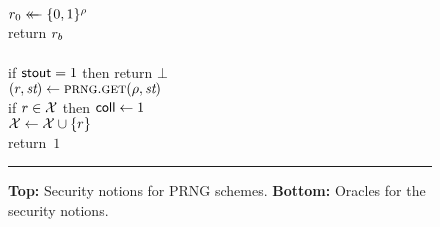 \begin{figure}[t]
{      $r_0 \mathrel{\leftarrow\mkern-14mu\leftarrow} \{0,1\}^\rho$\\
      return $r_b$
    \\[6pt]
    \oraclev{$\GETUPO(\coinslen)$}\\[2pt]
      if $\mathsf{stout} = 1$ then return $\bot$\\
      $(r, \textit{st}) \gets \textsc{prng}.\textsc{get}(\rho, \textit{st})$\\
      if $r \in \mathcal{X}$ then $\mathsf{coll} \gets 1$\\
      $\mathcal{X} \gets \mathcal{X} \cup \{ r \}$\\
      return~$1$
  }
  \caption{\textbf{Top:} Security notions for PRNG schemes.
  \textbf{Bottom:} Oracles for the security notions.}
  \vspace{6pt}\hrule
  \label{fig:prng-sec}
\end{figure}
